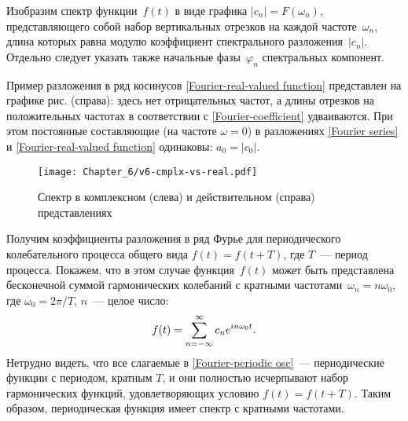 Изобразим спектр функции~$f(t)$ в виде графика $|c_n|=F(\omega_n)$, 
представляющего собой набор вертикальных отрезков на каждой частоте~$\omega_n$, 
длина которых равна модулю коэффициент спектрального разложения~$|c_n|$.
Отдельно следует указать также начальные фазы~$\varphi_n$ 
спектральных компонент.

Пример разложения в ряд косинусов \eqref{Fourier-real-valued function} 
представлен на графике рис.  (справа): здесь нет
отрицательных частот, а длины отрезков на положительных частотах в соответствии с
\eqref{Fourier-coefficient} удваиваются. При этом постоянные составляющие
(на частоте $\omega=0$) в разложениях \eqref{Fourier series} и
\eqref{Fourier-real-valued function} одинаковы: $a_0=|c_0|$.

\begin{figure}[ht]
    \centering\texttt{[image: Chapter\_6/v6-cmplx-vs-real.pdf]}
    \caption{Спектр в комплексном (слева) и действительном (справа) представлениях}
\end{figure}

\label{sec:spectrum-periodic}
Получим коэффициенты разложения в ряд Фурье для периодического колебательного
процесса общего вида $f(t)=f(t+T)$, где $T$~--- период процесса.
Покажем, что в этом случае функция~$f(t)$ может быть представлена
бесконечной суммой гармонических колебаний с кратными частотами~$\omega_n=n\omega_0$,
где $\omega_0=2\pi/T$, $n$~--- целое число:
\begin{equation}
    \eqmark{Fourier-periodic osc}
    f(t)=\sum_{n=-\infty}^{\infty} c_n e^{in\omega_0 t}.
\end{equation}
Нетрудно видеть, что все слагаемые в \eqref{Fourier-periodic osc}~---
периодические функции с периодом, кратным $T$, и они полностью исчерпывают
набор гармонических функций, удовлетворяющих условию $f(t)=f(t+T)$.
Таким образом, периодическая функция имеет 
спектр с кратными частотами.


